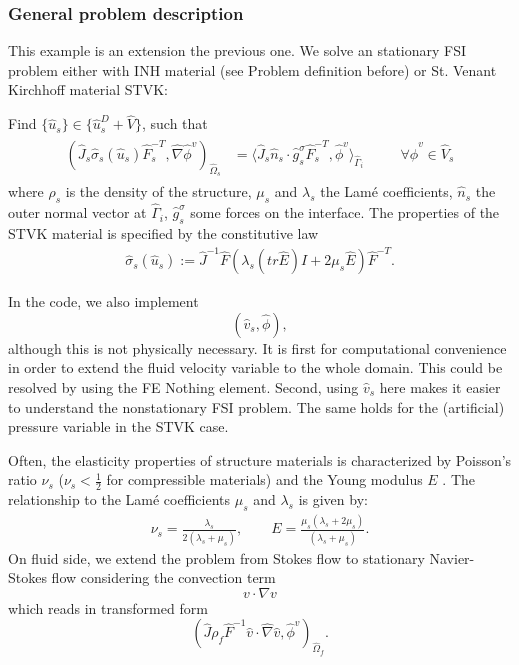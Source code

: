 \subsubsection{General problem description}

This example is an extension the previous one.
We solve an stationary FSI problem either with 
INH material (see Problem definition before) 
or St. Venant Kirchhoff material STVK:  
\begin{Problem}
  \label{prob:stvk:lagrange}
  Find $\{\hat u_s\} \in \{ \hat u_s^D + \hat V\}$, 
  such that 
  \begin{eqnarray}
    \begin{aligned}   
      (\hat J_s \hat\sigma_s(\hat u_s) \hat F_s^{-T},\hat\nabla\hat\phi^v)_{\hat\Omega_s}
      &= \langle\hat J_s\hat n_s\cdot \hat g_s^\sigma\hat
      F_s^{-T},\hat\phi^v  \rangle_{\hat\Gamma_i}
      &&\quad\forall\hat \phi^v\in\hat V_s
    \end{aligned}
  \end{eqnarray}
  where $\rho_s$ is the density of the structure, $\mu_s$ and $\lambda_s$ 
  the Lam\'e coefficients, $\hat n_s$ the outer normal vector at $\hat\Gamma_i$, 
  $\hat g_s^\sigma$ some forces on the interface. The properties of the STVK material
  is specified by the constitutive law
  \begin{eqnarray}
    \hat\sigma_s(\hat u_s):=\hat J^{-1} \hat F (\lambda_s (tr\hat E) I + 2\mu_s \hat E)\hat F^{-T}.
  \end{eqnarray}
\end{Problem}
\begin{remark}
In the code, we also implement 
\[
(\hat v_s, \hat\phi),
\]
although this is not physically necessary. It is first for computational
convenience in order to extend the fluid velocity variable to the whole
domain.
This could be resolved by using the FE Nothing element. Second, 
using $\hat v_s$ here makes it easier to understand the 
nonstationary FSI problem. The same holds for the (artificial) 
pressure variable 
in the STVK case.
\end{remark}

Often, the elasticity properties of structure materials is characterized by 
Poisson's ratio $\nu_s$ ($\nu_s < \frac{1}{2}$  for 
compressible materials) and the Young modulus $E$ . The 
relationship to the Lam\'e coefficients $\mu_s$ and $\lambda_s$ is
given by:
\begin{eqnarray}
\nu_s = \frac{\lambda_s}{2(\lambda_s + \mu_s)}, \qquad 
E = \frac{\mu_s (\lambda_s + 2\mu_s)}{(\lambda_s + \mu_s )} . 
\end{eqnarray}
On fluid side, we extend the problem from Stokes flow 
to stationary Navier-Stokes flow considering the convection term
\[
v\cdot \nabla v
\]
which reads in transformed form \cite{Wi11}
\[
             (\hat J \rho_f \hat F^{-1}\hat  v\cdot\hat\nabla \hat v,
             \hat\phi^v)_{\hat\Omega_f}.
\]





